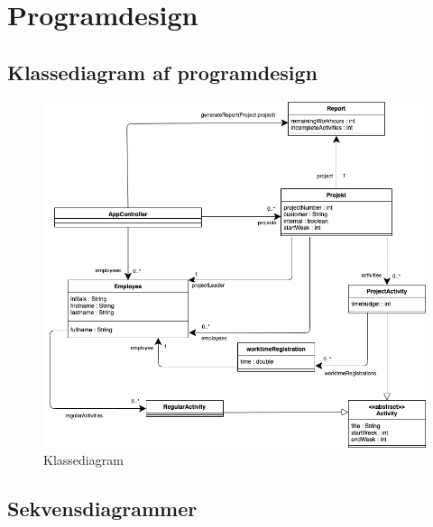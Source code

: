 \section{Programdesign}
\subsection{Klassediagram af programdesign}
\begin{figure}[H]
    \centering
    \caption{Klassediagram}\label{fig:ClassDiag}
    \includegraphics[width = .75\textwidth]{Diagrams/Klassediagram_eng.png}
\end{figure}
\subsection{Sekvensdiagrammer}